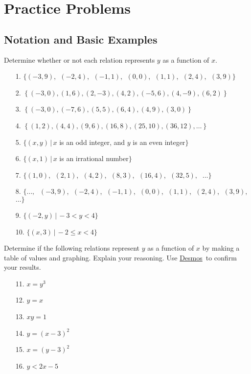 \documentclass[12pt]{book}
\theoremstyle{definition}
\newcommand{\Desmos}{\href{https://www.desmos.com/}{Desmos}}
\begin{document}
\section{Practice Problems}
\subsection*{Notation and Basic Examples}                                
Determine whether or not each relation represents $y$ as a function of $x$.  
\begin{enumerate}
\item[1.]  $\{(-3, 9)$, $\;(-2, 4)$, $\;(-1, 1)$, $\;(0, 0)$, $\;(1, 1)$, $\;(2, 4)$, $\;(3, 9)\}$
\item[2.]  $\left\{ (-3,0), (1,6), (2, -3), (4,2), (-5,6), (4, -9), (6,2) \right\}$
\item[3.]  $\left\{ (-3,0), (-7,6), (5,5), (6,4), (4,9), (3,0) \right\}$
\item[4.]  $\left\{ (1,2), (4,4), (9,6), (16,8), (25,10), (36, 12), \ldots \right\}$
\item[5.]  $\{(x, y) \, | \, x$ is an odd integer, and $y$ is an even integer$\}$
\item[6.]  $\{(x, 1) \, | \, x$ is an irrational number$\}$
\item[7.]  $\{(1, 0)$, $\;(2, 1)$, $\;(4, 2)$, $\;(8, 3)$, $\;(16, 4)$, $\;(32, 5), \;$ $\ldots\}$
\item[8.]  $\{\ldots,$ $\;(-3, 9)$, $\;(-2, 4)$, $\;(-1, 1)$, $\;(0, 0)$, $\;(1, 1)$, $\;(2, 4)$, $\;(3, 9), \;$ $\ldots\}$
\end{enumerate}
\begin{multicols}{2}
\begin{enumerate}
\item[9.] $\{ (-2, y) \, | \, -3 < y < 4\}$
\item[10.] $\{ (x,3) \, | \,  -2 \leq x < 4\}$
\end{enumerate}
\end{multicols}
Determine if the following relations represent $y$ as a function of $x$ by making a table of values and graphing.  Explain your reasoning.  Use \Desmos \ to confirm your results.
\begin{center}
\begin{multicols}{3}
\begin{enumerate}
	\item[11.] $x=y^3$
	\item[12.] $y=x$
	\item[13.] $xy=1$
	\item[14.] $y=(x-3)^2$
	\item[15.] $x=(y-3)^2$
	\item[16.] $y<2x-5$
\end{enumerate}
\end{multicols}
\end{center}
\end{document}
